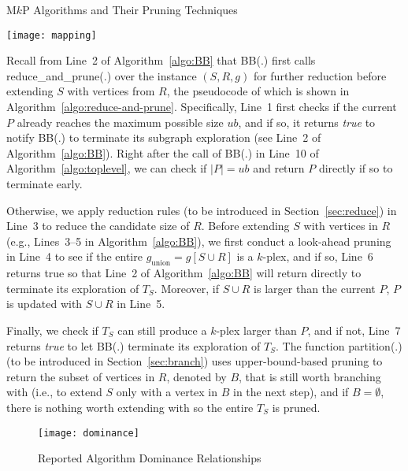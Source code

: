 \documentclass[sigconf, nonacm]{acmart}
\begin{document}
\begin{table*}[t]
  \caption{M$k$P Algorithms and Their Pruning Techniques}\label{table:mapping}
  \vspace{-3mm}
  \texttt{[image: mapping]}
  \vspace{-5mm}
\end{table*}

\vspace{1mm}
 Recall from Line~2 of Algorithm~\ref{algo:BB} that BB(.) first calls reduce\_and\_prune(.) over the instance $(S,R, g)$ for further reduction before extending $S$ with vertices from $R$, the pseudocode of which is shown in Algorithm~\ref{algo:reduce-and-prune}. 
Specifically, Line~1 first checks if the current $P$ already reaches the maximum possible size $ub$, and if so, it returns {\em true} to notify BB(.) to terminate its subgraph exploration (see Line~2 of Algorithm~\ref{algo:BB}). 
Right after the call of BB(.) in Line~10 of Algorithm~\ref{algo:toplevel}, we can check if $|P|=ub$ and return $P$ directly if so to terminate early.

Otherwise, we apply reduction rules (to be introduced in Section~\ref{sec:reduce}) in Line~3 to reduce the candidate size of $R$.  
Before extending $S$ with vertices in $R$ (e.g., Lines~3--5 in Algorithm~\ref{algo:BB}), we first conduct a look-ahead pruning in Line~4 to see if the entire $g_\text{union}=g[S\cup R]$ is a $k$-plex, and if so, Line~6 returns true so that Line~2 of Algorithm~\ref{algo:BB} will return directly to terminate its exploration of $T_S$. Moreover, if $S\cup R$ is larger than the current $P$, $P$ is updated with $S\cup R$ in Line~5.

Finally, we check if $T_{S}$ can still produce a $k$-plex larger than $P$, and if not, Line~7 returns {\em true} to let BB(.) terminate its exploration of $T_S$. The function partition(.) (to be introduced in Section~\ref{sec:branch}) uses upper-bound-based pruning to return the subset of vertices in $R$, denoted by $B$, that is still worth branching with (i.e., to extend $S$ only with a vertex in $B$ in the next step), and if $B=\emptyset$, there is nothing worth extending with so the entire $T_S$ is pruned.
 
\begin{figure}[t]
\vspace{2mm}
  \texttt{[image: dominance]}
  \vspace{-3mm}
  \caption{Reported Algorithm Dominance Relationships}\label{fig:dominance}
\end{figure}
\setlength{\textfloatsep}{0pt}
\end{document}
